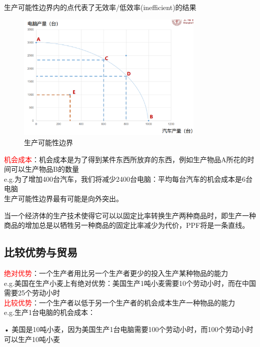 \documentclass[12pt,a4paper]{article}
\begin{document}
生产可能性边界内的点代表了无效率/低效率(inefficient)的结果

\begin{figure}[H] 
  \centering %
  \includegraphics[width=0.8\textwidth]{生产可能性边界.png} %
  \caption{生产可能性边界} %
  \label{fig:cycle} %
\end{figure}
\textcolor{red}{机会成本}：机会成本是为了得到某件东西所放弃的东西，例如生产物品A所花的时间可以生产物品B的数量\\

e.g.为了增加400台汽车，我们将减少2400台电脑：平均每台汽车的机会成本是6台电脑\\

生产可能性边界最有可能是向外突出。

当一个经济体的生产技术使得它可以以固定比率转换生产两种商品时，即生产一种商品的增加总是以牺牲另一种商品的固定比率减少为代价，PPF将是一条直线。

\subsection{比较优势与贸易}

\textcolor{red}{绝对优势}：一个生产者用比另一个生产者更少的投入生产某种物品的能力\\

e.g.美国在生产小麦上有绝对优势：美国生产1吨小麦需要10个劳动小时，而在中国需要25个劳动小时\\

\textcolor{red}{比较优势}：一个生产者以低于另一个生产者的机会成本生产一种物品的能力\\

e.g.生产1台电脑的机会成本：

• 美国是10吨小麦，因为美国生产1台电脑需要100个劳动小时，而100个劳动小时可以生产10吨小麦
\end{document}
